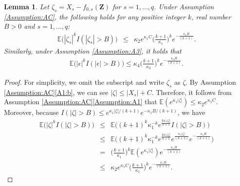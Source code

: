 \documentclass[11pt, preprint]{imsart}
\numberwithin{equation}{section}
\def \mcF{\mathcal{F}}
\def \bfZ{\mathbf{Z}}
\def \bfz{\mathbf{z}}
\def \ev{\mathbb{E}}
\theoremstyle{plain}
\newtheorem{lemma}{\indent Lemma}
\theoremstyle{definition}
\begin{document}




\begin{lemma}\label{lemma:moment:bound}
Let $\zeta_s=X_s-f_{0,s}(\bfZ)$ for $s=1,\ldots, q$. Under Assumption \ref{Assumption:AC}, the following holds for any positive integer $k$, real number $B>0$ and $s=1,\ldots, q$:
\begin{eqnarray}
	\ev\bigg(|\zeta_s|^kI(|\zeta_s|>B)\bigg)
	&\leq& \kappa_2e^{\kappa_1C}\bigg(\frac{k+1}{\kappa_1}\bigg)^ke^{-\frac{\kappa_1B}{(k+1)}}.\nonumber
\end{eqnarray}
Similarly, under Assumption \ref{Assumption:A3}, it holds that
\begin{eqnarray*}
	\ev\bigg(|\epsilon|^kI(|\epsilon|>B)\bigg)\leq \kappa_4\bigg(\frac{k+1}{\kappa_3}\bigg)^ke^{-\frac{\kappa_3B}{(k+1)}}.\nonumber
\end{eqnarray*}
\end{lemma}
\begin{proof}
For simplicity, we omit the subscript and write $\zeta_{s}$ as $\zeta$. By Assumption \ref{Assumption:AC}\ref{A1:b}, we can see $|\zeta|\leq |X_s|+C$. Therefore, it follows from  Assumption \ref{Assumption:AC}\ref{Assumption:A1} that $\ev(e^{\kappa_1|\zeta|})\leq \kappa_2e^{\kappa_1C}$. Moreover, because $I(|\zeta|>B)\leq e^{\kappa_1|\zeta|/(k+1)}e^{-\kappa_1B/(k+1)}$, we have
\begin{eqnarray}
	\ev\bigg(|\zeta|^kI(|\zeta|>B)\bigg)&\leq&\ev\bigg((k+1)^k\kappa_1^{-k}e^{\frac{k\kappa_1|\zeta|}{k+1}}I(|\zeta|>B)\bigg)\nonumber\\
	&\leq&\ev\bigg((k+1)^k\kappa_1^{-k}e^{\frac{k\kappa_1|\zeta|}{k+1}}e^{\frac{\kappa_1|\zeta|}{(k+1)}}e^{-\frac{\kappa_1B}{(k+1)}}\bigg)\nonumber\\
	&=&\bigg(\frac{k+1}{\kappa_1}\bigg)^k\ev(e^{\kappa_1|\zeta|})e^{-\frac{\kappa_1B}{(k+1)}}\nonumber\\
	&\leq& \kappa_2e^{\kappa_1C}\bigg(\frac{k+1}{\kappa_1}\bigg)^ke^{-\frac{\kappa_1B}{(k+1)}}.\nonumber
\end{eqnarray}
\end{proof}
\end{document}
